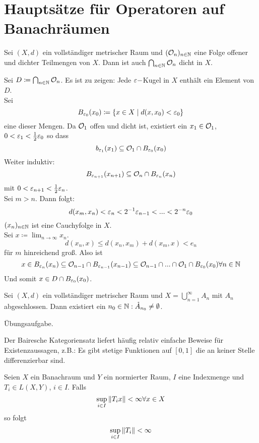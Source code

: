 \chapter{Haupts\"atze f\"ur Operatoren auf Banachr\"aumen}
\begin{satz}
	Sei $ (X,d) $ ein vollst\"andiger metrischer Raum und $ (\mathcal O_n)_{n\in\mathbb{N}} $ eine Folge offener und dichter Teilmengen von $ X $. Dann ist auch $ \bigcap_{n\in\mathbb{N}}\mathcal O_n $ dicht in $ X $.
\end{satz}
\begin{beweis}
	Sei $ D\coloneqq\bigcap_{n\in\mathbb{N}}\mathcal O_n $. Es ist zu zeigen: Jede $ \varepsilon- $Kugel in $ X $ enth\"alt ein Element von $ D $.\\
	Sei
	\[ B_{\varepsilon_0}(x_0)\coloneqq\lbrace x\in X\mid d(x,x_0)<\varepsilon_0\rbrace \]
	eine dieser Mengen. Da $ \mathcal O_1 $ offen und dicht ist, existiert ein $ x_1\in\mathcal O_1 $, $ 0<\varepsilon_1<\frac{1}{2}\varepsilon_0 $ so dass
	\[ b_{\varepsilon_1}(x_1)\subseteq\mathcal O_1\cap B_{\varepsilon_0}(x_0) \]
	Weiter induktiv:
	\[ B_{\varepsilon_{n+1}}(x_{n+1})\subseteq \mathcal O_n\cap B_{\varepsilon_n}(x_n) \]
	mit $ 0<\varepsilon_{n+1}<\frac{1}{2}\varepsilon_n $.\\
	Sei $ m>n $. Dann folgt:
	\[ d(x_m,x_n)<\varepsilon_n<2^{-1}\varepsilon_{n-1}<...<2^{-n}\varepsilon_0 \]
	$ (x_n)_{n\in\mathbb{N}} $ ist eine Cauchyfolge in $ X $.\\
	Sei $ x\coloneqq\lim_{n\to\infty} x_n $.
	\[ d(x_n,x)\leq d(x_n,x_m)+d(x_m,x)<e_n \]
	f\"ur $ m $ hinreichend gro\ss. Also ist \[ x\in B_{\varepsilon_n}(x_n)\subseteq\mathcal O_{n-1}\cap B_{\varepsilon_{n-1}}(x_{n-1})\subseteq\mathcal O_{n-1}\cap...\cap\mathcal O_1\cap B_{\varepsilon_0}(x_0)\forall n\in\mathbb{N} \]
	Und somit $ x\in D\cap B_{\varepsilon_0}(x_0) $.
\end{beweis}
\begin{korollar}
	Sei $ (X,d) $ ein vollst\"andiger metrischer Raum und $ X=\bigcup_{n=1}^\infty A_n $ mit $ A_n $ abgeschlossen. Dann existiert ein $ n_0\in\mathbb{N}: \mathring A_{n_0}\neq\emptyset$.
\end{korollar}
\begin{beweis}
	\"Ubungsaufgabe.
\end{beweis}
\begin{bemerkung*}
	Der Bairesche Kategoriensatz liefert h\"aufig relativ einfache Beweise f\"ur Existenzaussagen, z.B.: Es gibt stetige Funktionen auf $ [0,1] $ die an keiner Stelle differenzierbar sind.
\end{bemerkung*}
\begin{theorem}
	Seien $ X $ ein Banachraum und $ Y $ ein normierter Raum, $ I $ eine Indexmenge und $ T_i\in L(X,Y)  $, $ i\in I $. Falls
	\[ \sup_{i\in I}\left\|T_ix\right\|<\infty\forall x\in X \]
	so folgt
	\[ \sup_{i\in I}\left\|T_i\right\|<\infty \]
\end{theorem}
